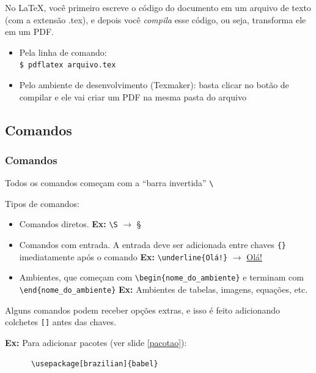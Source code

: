 \documentclass[12pt]{beamer}
\begin{document}
\begin{frame}[fragile]
  No \LaTeX, você primeiro escreve o código do documento em um arquivo de texto (com a extensão .tex), e depois você \emph{compila} esse código, ou seja, transforma ele em um PDF.

  \begin{itemize}
    \item Pela linha de comando:\\
    \verb+$ pdflatex arquivo.tex+
    \item Pelo ambiente de desenvolvimento (Texmaker): basta clicar no botão de compilar e ele vai criar um PDF na mesma pasta do arquivo
  \end{itemize}
\end{frame}

\begin{frame}[fragile]
  \section{Comandos}
  \frametitle{Comandos}
  Todos os comandos começam com a ``barra invertida'' \verb+\+
  \medskip

  Tipos de comandos:
  \begin{itemize}
    \item Comandos diretos. \textbf{Ex:} \verb+\S+ $\rightarrow$ \S

    \item Comandos com entrada. A entrada deve ser adicionada entre chaves \verb+{}+ imediatamente após o comando \textbf{Ex:} \verb+\underline{Olá!}+ $\rightarrow$ \underline{Olá!}

    \item Ambientes, que começam com \verb+\begin{nome_do_ambiente}+ e terminam com \verb+\end{nome_do_ambiente}+ \textbf{Ex:} Ambientes de tabelas, imagens, equações, etc.
  \end{itemize}

\end{frame}

\begin{frame}[fragile]
  Alguns comandos podem receber opções extras, e isso é feito adicionando colchetes \verb+[]+ antes das chaves.
  \medskip

  \textbf{Ex:} Para adicionar pacotes (ver slide \ref{pacotao}):
    \begin{verbatim}
      \usepackage[brazilian]{babel}
    \end{verbatim}
\end{frame}
\end{document}
